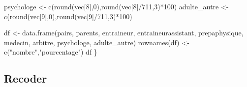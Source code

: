 \documentclass[
]{article}
\newenvironment{Shaded}{\begin{snugshade}}{\end{snugshade}}
\newcommand{\DecValTok}[1]{\textcolor[rgb]{0.00,0.00,0.81}{#1}}
\newcommand{\FunctionTok}[1]{\textcolor[rgb]{0.00,0.00,0.00}{#1}}
\newcommand{\NormalTok}[1]{#1}
\newcommand{\OtherTok}[1]{\textcolor[rgb]{0.56,0.35,0.01}{#1}}
\newcommand{\SpecialCharTok}[1]{\textcolor[rgb]{0.00,0.00,0.00}{#1}}
\newcommand{\StringTok}[1]{\textcolor[rgb]{0.31,0.60,0.02}{#1}}
\begin{document}
\begin{Shaded}
\begin{Highlighting}[]
\NormalTok{  psychologe          }\OtherTok{\textless{}{-}} \FunctionTok{c}\NormalTok{(}\FunctionTok{round}\NormalTok{(vec[}\DecValTok{8}\NormalTok{],}\DecValTok{0}\NormalTok{),}\FunctionTok{round}\NormalTok{(vec[}\DecValTok{8}\NormalTok{]}\SpecialCharTok{/}\DecValTok{711}\NormalTok{,}\DecValTok{3}\NormalTok{)}\SpecialCharTok{*}\DecValTok{100}\NormalTok{)}
\NormalTok{  adulte\_autre        }\OtherTok{\textless{}{-}} \FunctionTok{c}\NormalTok{(}\FunctionTok{round}\NormalTok{(vec[}\DecValTok{9}\NormalTok{],}\DecValTok{0}\NormalTok{),}\FunctionTok{round}\NormalTok{(vec[}\DecValTok{9}\NormalTok{]}\SpecialCharTok{/}\DecValTok{711}\NormalTok{,}\DecValTok{3}\NormalTok{)}\SpecialCharTok{*}\DecValTok{100}\NormalTok{)}

\NormalTok{  df }\OtherTok{\textless{}{-}} \FunctionTok{data.frame}\NormalTok{(pairs, parents, entraineur, entraineurassistant, prepaphysique, medecin, arbitre, psychologe, adulte\_autre)}
  \FunctionTok{rownames}\NormalTok{(df) }\OtherTok{\textless{}{-}} \FunctionTok{c}\NormalTok{(}\StringTok{"nombre"}\NormalTok{,}\StringTok{"pourcentage"}\NormalTok{)}
\NormalTok{  df}
\NormalTok{\}}
\end{Highlighting}
\end{Shaded}

\hypertarget{recoder}{%
\subsection{Recoder}\label{recoder}}
\end{document}
